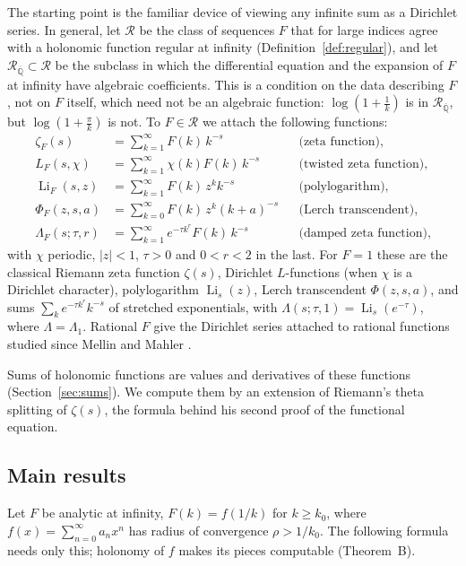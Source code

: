 \documentclass[11pt,reqno]{amsart}
\theoremstyle{definition}
\theoremstyle{remark}
\newcommand{\Li}{\operatorname{Li}}
\newcommand{\Qbar}{\overline{\mathbb{Q}}}
\newcommand{\Reg}{\mathcal{R}}
\newcommand{\RegQ}{\mathcal{R}_{\Qbar}}
\begin{document}
The starting point is the familiar device of viewing any infinite sum
as a Dirichlet series.
In general, let $\Reg$ be the class of sequences $F$ that for large indices
agree with a holonomic function regular at infinity (Definition~\ref{def:regular}), and let $\RegQ \subset \Reg$ be
the subclass in which the differential equation and the expansion of $F$ at infinity have algebraic coefficients.
This is a condition on the data describing $F$, not on $F$ itself, which need not be an algebraic function:
$\log(1+\frac1k)$ is in $\RegQ$, but $\log(1+\frac{\pi}{k})$ is not. To $F \in \Reg$ we attach the following
functions:
\begin{equation}\label{eq:functions}
\begin{aligned}
  \zeta_F(s) &= \sum_{k=1}^{\infty}F(k)\,k^{-s} &&\text{(zeta function)}, \\
  L_F(s,\chi) &= \sum_{k=1}^{\infty}\chi(k)F(k)\,k^{-s} &&\text{(twisted zeta function)}, \\
  \Li_F(s,z) &= \sum_{k=1}^{\infty}F(k)\,z^kk^{-s} &&\text{(polylogarithm)}, \\
  \Phi_F(z,s,a) &= \sum_{k=0}^{\infty}F(k)\,z^k(k+a)^{-s} &&\text{(Lerch transcendent)}, \\
  \Lambda_F(s;\tau,r) &= \sum_{k=1}^{\infty}e^{-\tau k^r}F(k)\,k^{-s} &&\text{(damped zeta function)},
\end{aligned}
\end{equation}
with $\chi$ periodic, $|z| < 1$, $\tau > 0$ and $0 < r < 2$ in the last.
For $F = 1$ these are the classical
Riemann zeta function $\zeta(s)$, Dirichlet $L$-functions (when $\chi$ is a Dirichlet character), polylogarithm $\Li_s(z)$, Lerch
transcendent $\Phi(z,s,a)$, and sums $\sum_ke^{-\tau k^r}k^{-s}$ of stretched exponentials, with
$\Lambda(s;\tau,1) = \Li_s(e^{-\tau})$, where $\Lambda = \Lambda_1$.
Rational $F$ give the Dirichlet series attached to rational functions
studied since Mellin and Mahler \cite{Mah28,CN81,Sar84,Pet98,Ess97}.

Sums of holonomic functions are values and derivatives of these functions (Section~\ref{sec:sums}). We compute them by an extension of Riemann's theta splitting of $\zeta(s)$, the formula behind his second proof
of the functional equation.

\subsection{Main results}
Let $F$ be analytic at infinity, $F(k) = f(1/k)$ for $k \ge k_0$, where
$f(x) = \sum_{n=0}^{\infty} a_nx^n$ has radius of convergence $\rho > 1/k_0$. The following formula needs only this;
holonomy of $f$ makes its pieces computable (Theorem~B).
\end{document}

